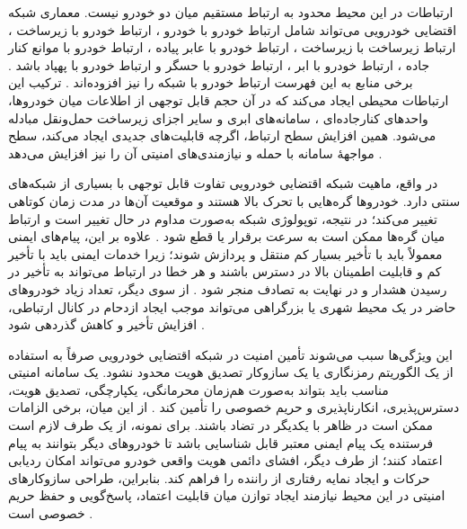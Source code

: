 ارتباطات در این محیط محدود به ارتباط مستقیم میان دو خودرو نیست. معماری شبکه اقتضایی خودرویی می‌تواند شامل ارتباط خودرو با خودرو ، ارتباط خودرو با زیرساخت ، ارتباط زیرساخت با زیرساخت ، ارتباط خودرو با عابر پیاده ، ارتباط خودرو با موانع کنار جاده ، ارتباط خودرو با ابر ، ارتباط خودرو با حسگر  و ارتباط خودرو با پهپاد  باشد \cite{hozouriOverviewVANETVehicular2023}. برخی منابع به این فهرست ارتباط خودرو با شبکه  را نیز افزوده‌اند \cite{farsimadanReviewSecurityChallenges2025}. ترکیب این ارتباطات محیطی ایجاد می‌کند که در آن حجم قابل توجهی از اطلاعات میان خودروها، واحدهای کنارجاده‌ای ، سامانه‌های ابری و سایر اجزای زیرساخت حمل‌ونقل مبادله می‌شود. همین افزایش سطح ارتباط، اگرچه قابلیت‌های جدیدی ایجاد می‌کند، سطح مواجههٔ سامانه با حمله و نیازمندی‌های امنیتی آن را نیز افزایش می‌دهد \cite{hozouriOverviewVANETVehicular2023,farsimadanReviewSecurityChallenges2025}.

در واقع، ماهیت شبکه اقتضایی خودرویی تفاوت قابل توجهی با بسیاری از شبکه‌های سنتی دارد. خودروها گره‌هایی با تحرک بالا هستند و موقعیت آن‌ها در مدت زمان کوتاهی تغییر می‌کند؛ در نتیجه، توپولوژی شبکه به‌صورت مداوم در حال تغییر است و ارتباط میان گره‌ها ممکن است به سرعت برقرار یا قطع شود \cite{luConnectedVehiclesSolutions2014,hozouriOverviewVANETVehicular2023}. علاوه بر این، پیام‌های ایمنی معمولاً باید با تأخیر بسیار کم منتقل و پردازش شوند؛ زیرا خدمات ایمنی باید با تأخیر کم و قابلیت اطمینان بالا در دسترس باشند و هر خطا در ارتباط می‌تواند به تأخیر در رسیدن هشدار و در نهایت به تصادف منجر شود \cite{hozouriOverviewVANETVehicular2023}. از سوی دیگر، تعداد زیاد خودروهای حاضر در یک محیط شهری یا بزرگراهی می‌تواند موجب ایجاد ازدحام در کانال ارتباطی، افزایش تأخیر و کاهش گذردهی شود \cite{hozouriOverviewVANETVehicular2023,xuInternetVehiclesBig2018}.

این ویژگی‌ها سبب می‌شوند تأمین امنیت در شبکه اقتضایی خودرویی صرفاً به استفاده از یک الگوریتم رمزنگاری یا یک سازوکار تصدیق هویت محدود نشود. یک سامانه امنیتی مناسب باید بتواند به‌صورت هم‌زمان محرمانگی، یکپارچگی، تصدیق هویت، دسترس‌پذیری، انکارناپذیری  و حریم خصوصی را تأمین کند \cite{farsimadanReviewSecurityChallenges2025,VanetSecurityPrivacy}. از این میان، برخی الزامات ممکن است در ظاهر با یکدیگر در تضاد باشند. برای نمونه، از یک طرف لازم است فرستنده یک پیام ایمنی معتبر قابل شناسایی باشد تا خودروهای دیگر بتوانند به پیام اعتماد کنند؛ از طرف دیگر، افشای دائمی هویت واقعی خودرو می‌تواند امکان ردیابی حرکات و ایجاد نمایه رفتاری از راننده را فراهم کند. بنابراین، طراحی سازوکارهای امنیتی در این محیط نیازمند ایجاد توازن میان قابلیت اعتماد، پاسخ‌گویی  و حفظ حریم خصوصی است \cite{VanetSecurityPrivacy,rahmawatiagustinaSystematicLiteratureReview2025}.

